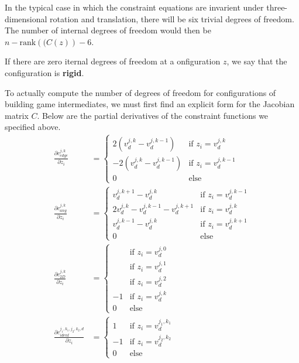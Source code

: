 In the typical case in which the constraint equations are invarient under three-dimensional rotation and translation, there will be six trivial degrees of freedom. The number of internal degrees of freedom would then be $n - \text{rank}\left((C(z)\right) - 6$.  

\begin{mydef}
If there are zero iternal degrees of freedom at a onfiguration $z$, we say that the configuration is \textbf{rigid}.
\end{mydef}

To actually compute the number of degrees of freedom for configurations of building game intermediates, we must first find an explicit form for the Jacobian matrix $C$. Below are the partial derivatives of the constraint functions we specified above.  
\begin{align}
	\frac{\partial c_{edge}^{j,k}}{\partial z_i} &=
  	\begin{cases}
        	2\left(v^{j,k}_d-v^{j,k-1}_d\right) 	& \text{if } z_i = v^{j,k}_d \\
   		-2\left(v^{j,k}_d-v^{j,k-1}_d\right) 	& \text{if } z_i = v^{j,k-1}_d \\
   		0       				& \text{else} 
  	\end{cases} \\
	\frac{\partial c_{ang}^{j,k}}{\partial z_i} &=
  	\begin{cases}
        	v^{j,k+1}_d-v^{j,k}_d 			& \text{if } z_i = v^{j,k-1}_d \\
        	2v^{j,k}_d-v^{j,k-1}_d -v^{j,k+1}_d 	& \text{if } z_i = v^{j,k}_d \\
   		v^{j,k-1}_d-v^{j,k}_d 			& \text{if } z_i = v^{j,k+1}_d \\
   		0       				& \text{else} 
  	\end{cases} \\
	\frac{\partial c_{2D}^{j,k}}{\partial z_i} &=
  	\begin{cases}
        		& \text{if } z_i = v^{j,0}_d \\
        		& \text{if } z_i = v^{j,1}_d \\
        		& \text{if } z_i = v^{j,2}_d \\
          	-1 	& \text{if } z_i = v^{j,k}_d \\
   	  	0 	& \text{else} 
  	\end{cases} \\
	\frac{\partial c_{ident}^{j_1,k_1,j_2,k_2,d}}{\partial z_i} &=
  	\begin{cases}
        	1 	& \text{if } z_i = v^{j_1,k_1}_d \\
        	-1 	& \text{if } z_i = v^{j_2,k_2}_d \\
   		0       & \text{else} 
  	\end{cases} 
\end{align}

